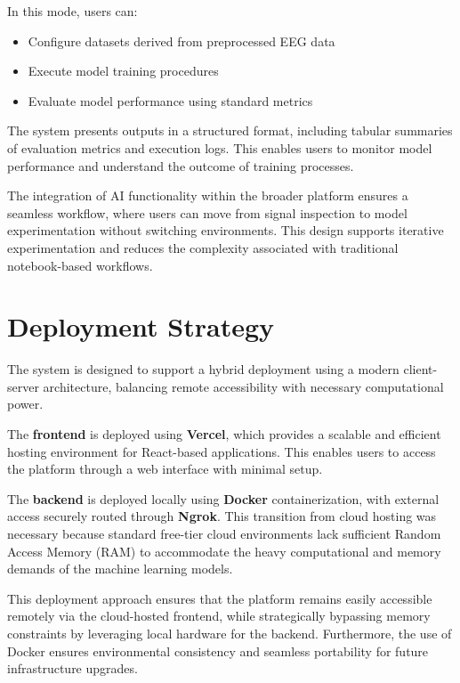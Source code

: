 In this mode, users can:

\begin{itemize}
    \item Configure datasets derived from preprocessed EEG data
    \item Execute model training procedures
    \item Evaluate model performance using standard metrics
\end{itemize}

The system presents outputs in a structured format, including tabular summaries of evaluation metrics and execution logs. This enables users to monitor model performance and understand the outcome of training processes.

The integration of AI functionality within the broader platform ensures a seamless workflow, where users can move from signal inspection to model experimentation without switching environments. This design supports iterative experimentation and reduces the complexity associated with traditional notebook-based workflows.

\vspace{2em}

\section{Deployment Strategy}
\label{sec:deployment-strategy}

The system is designed to support a hybrid deployment using a modern client-server architecture, balancing remote accessibility with necessary computational power.

The \textbf{frontend} is deployed using \textbf{Vercel}, which provides a scalable and efficient hosting environment for React-based applications. This enables users to access the platform through a web interface with minimal setup.

The \textbf{backend} is deployed locally using \textbf{Docker} containerization, with external access securely routed through \textbf{Ngrok}. This transition from cloud hosting was necessary because standard free-tier cloud environments lack sufficient Random Access Memory (RAM) to accommodate the heavy computational and memory demands of the machine learning models.

This deployment approach ensures that the platform remains easily accessible remotely via the cloud-hosted frontend, while strategically bypassing memory constraints by leveraging local hardware for the backend. Furthermore, the use of Docker ensures environmental consistency and seamless portability for future infrastructure upgrades.

